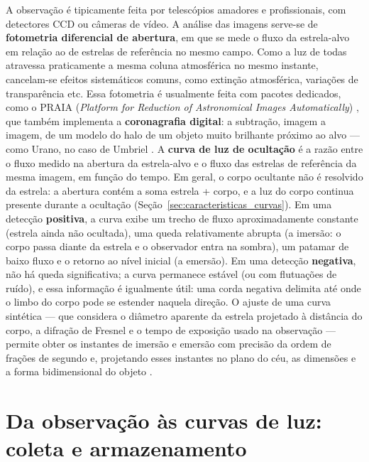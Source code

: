 \documentclass[msc]{on} %
\begin{document}
A observação é tipicamente feita por telescópios amadores e profissionais, com detectores CCD ou câmeras de vídeo. A análise das imagens serve-se de \textbf{fotometria diferencial de abertura}, em que se mede o fluxo da estrela-alvo em relação ao de estrelas de referência no mesmo campo. Como a luz de todas atravessa praticamente a mesma coluna atmosférica no mesmo instante, cancelam-se efeitos sistemáticos comuns, como extinção atmosférica, variações de transparência etc. Essa fotometria é usualmente feita com pacotes dedicados, como o PRAIA (\textit{Platform for Reduction of Astronomical Images Automatically}) \citep{AssafinPRAIA}, que também implementa a \textbf{coronagrafia digital}: a subtração, imagem a imagem, de um modelo do halo de um objeto muito brilhante próximo ao alvo --- como Urano, no caso de Umbriel \citep{Assafin2023}. A \textbf{curva de luz de ocultação} é a razão entre o fluxo medido na abertura da estrela-alvo e o fluxo das estrelas de referência da mesma imagem, em função do tempo. Em geral, o corpo ocultante não é resolvido da estrela: a abertura contém a soma estrela + corpo, e a luz do corpo continua presente durante a ocultação (Seção~\ref{sec:caracteristicas_curvas}). Em uma detecção \textbf{positiva}, a curva exibe um trecho de fluxo aproximadamente constante (estrela ainda não ocultada), uma queda relativamente abrupta (a imersão: o corpo passa diante da estrela e o observador entra na sombra), um patamar de baixo fluxo e o retorno ao nível inicial (a emersão). Em uma detecção \textbf{negativa}, não há queda significativa; a curva permanece estável (ou com flutuações de ruído), e essa informação é igualmente útil: uma corda negativa delimita até onde o limbo do corpo pode se estender naquela direção. O ajuste de uma curva sintética --- que considera o diâmetro aparente da estrela projetado à distância do corpo, a difração de Fresnel e o tempo de exposição usado na observação --- permite obter os instantes de imersão e emersão com precisão da ordem de frações de segundo e, projetando esses instantes no plano do céu, as dimensões e a forma bidimensional do objeto \citep{Ortiz2020, SORA2022}.



\section{Da observação às curvas de luz: coleta e armazenamento}
\label{sec:coleta_armazenamento}
\end{document}
